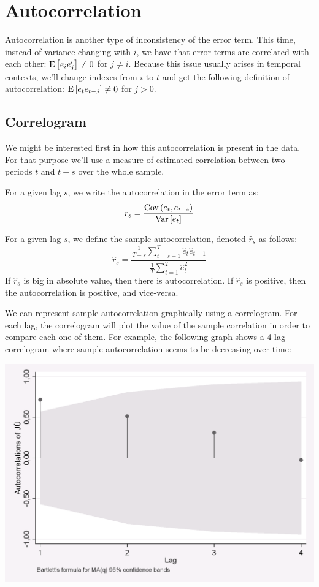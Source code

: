 \section{Autocorrelation}

Autocorrelation is another type of inconsistency of the error term. This time, instead of variance changing with $i$, we have that error terms are correlated with each other: $\operatorname{E}\left[e_ie_j'\right] \neq 0$ for $j\neq i$. Because this issue usually arises in temporal contexts, we'll change indexes from $i$ to $t$ and get the following definition of autocorrelation: $\operatorname{E}\left[e_te_{t-j}\right]\neq 0$ for $j > 0$. 

\subsection{Correlogram}

We might be interested first in how this autocorrelation is present in the data. For that purpose we'll use a measure of estimated correlation between two periods $t$ and $t-s$ over the whole sample.

\begin{definition}
For a given lag $s$, we write the autocorrelation in the error term as: $$ r_s = \frac{\operatorname{Cov}\left(e_t, e_{t-s}\right)}{\operatorname{Var}\left[e_t\right]} $$
\end{definition}

\begin{definition}
For a given lag $s$, we define the sample autocorrelation, denoted $\hat r_s$ as follows: $$\hat r_s = \frac{\frac{1}{T - s}\sum_{t = s+1}^{T}\hat e_t\hat e_{t-1}}{\frac{1}{T}\sum_{t = 1}^{T}\hat e_t^2} $$ If $\hat r_s$ is big in absolute value, then there is autocorrelation. If $\hat r_s$ is positive, then the autocorrelation is positive, and vice-versa.
\end{definition}

We can represent sample autocorrelation graphically using a correlogram. For each lag, the correlogram will plot the value of the sample correlation in order to compare each one of them. For example, the following graph shows a 4-lag correlogram where sample autocorrelation seems to be decreasing over time: \begin{center}
\includegraphics[scale=0.25]{images/defcorrelogram}
\end{center}

